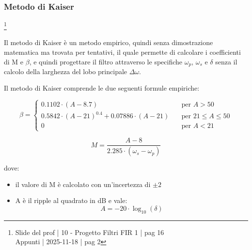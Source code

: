 \newpage 

\subsubsection{Metodo di Kaiser} \label{subsubsec: Metodo di Kaiser}

\footnote{ 
    Slide del prof | 10 - Progetto Filtri FIR 1 | pag 16\\
    Appunti | 2025-11-18 | pag 2
}  

Il metodo di Kaiser è un metodo empirico, quindi senza dimostrazione matematica ma trovata per tentativi, 
il quale permette di calcolare i coefficienti di M e $\beta$, e quindi progettare il filtro attraverso le specifiche $\omega_p$, $\omega_s$ e $\delta$ senza il calcolo della larghezza del lobo principale $\Delta \omega$. \newline 

Il metodo di Kaiser comprende le due seguenti formule empiriche: 

{
    \Large 
    \begin{equation}
        \beta 
        = 
        \begin{cases}
        0.1102 \cdot \left(A - 8.7\right) 
        \quad &\text{per } A > 50 
        \\
        0.5842 \cdot \left(A - 21\right)^{0.4} + 0.07886 \cdot \left( A - 21\right)    
        \quad &\text{per } 21 \leq A \leq 50 
        \\
        0  
        \quad &\text{per } A < 21
        \end{cases}
    \end{equation}
} 

{
    \Large 
    \begin{equation}
        M 
        = 
        \dfrac{A - 8}{2.285 \cdot \left(\omega_s - \omega_p\right)}
    \end{equation}
} 

dove: 

\begin{itemize}
    \item il valore di M è calcolato con un'incertezza di $\pm 2$ 
    \item A è il ripple al quadrato in dB e vale: 
    {
        \Large 
        \begin{equation}
            A = - 20 \cdot \log_{10} \left(\delta\right)
        \end{equation}
    }
\end{itemize}

